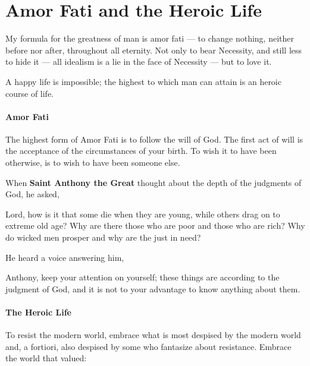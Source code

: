 \section{Amor Fati and the Heroic Life}

\begin{quotex}
My formula for the greatness of man is amor fati — to change nothing, neither before nor after, throughout all eternity. Not only to bear Necessity, and still less to hide it — all idealism is a lie in the face of Necessity — but to love it. 

A happy life is impossible; the highest to which man can attain is an heroic course of life. 

\end{quotex}
\paragraph{Amor Fati}
The highest form of Amor Fati is to follow the will of God. The first act of will is the acceptance of the circumstances of your birth. To wish it to have been otherwise, is to wish to have been someone else.

When \textbf{Saint Anthony the Great} thought about the depth of the judgments of God, he asked,

\begin{quotex}
Lord, how is it that some die when they are young, while others drag on to extreme old age? Why are there those who are poor and those who are rich? Why do wicked men prosper and why are the just in need? 

\end{quotex}
He heard a voice answering him,

\begin{quotex}
Anthony, keep your attention on yourself; these things are according to the judgment of God, and it is not to your advantage to know anything about them. 

\end{quotex}
\paragraph{The Heroic Life}
To resist the modern world, embrace what is most despised by the modern world and, a fortiori, also despised by some who fantasize about resistance. Embrace the world that valued:


